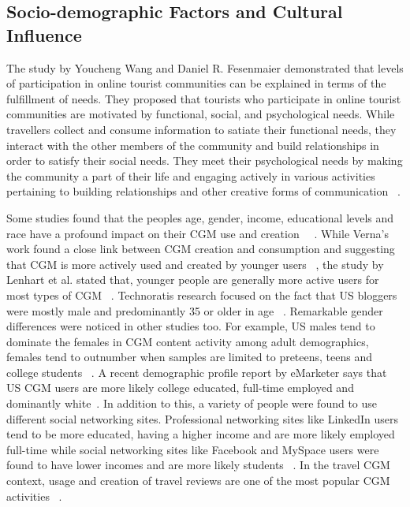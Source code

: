 \subsection{Socio-demographic Factors and Cultural Influence}

 

The study by Youcheng Wang and Daniel R. Fesenmaier demonstrated that levels of participation in online tourist communities can be explained in terms of the fulfillment of needs. They proposed that tourists who participate in online tourist communities are motivated by functional, social, and psychological needs. While travellers collect and consume information to satiate their functional needs, they interact with the other members of the community and build relationships in order to satisfy their social needs. They meet their psychological needs by making the community a part of their life and engaging actively in various activities pertaining to building relationships and other creative forms of communication ~\cite{wang2002defining}.

Some studies found that the people\textquotesingle s age, gender, income, educational levels and race have a profound impact on their CGM use and creation ~\cite{lenhart2008teens}~\cite{verna2009user}. While Verna's work  found a close link between CGM creation and consumption and suggesting that CGM is more actively used and created by younger users ~\cite{verna2009user}, the study by Lenhart et al. stated that, younger people are generally more active users for most types of CGM ~\cite{lenhart2008teens}.  Technorati\textquotesingle s research focused on the fact that US bloggers were mostly male and predominantly 35 or older in age ~\cite{technorati2008}. Remarkable gender differences were noticed in other studies too. For example, US males tend to dominate the females in CGM content activity among adult demographics, females tend to outnumber when samples are limited to preteens, teens and college students ~\cite{verna2009user}. A recent demographic profile report by eMarketer says that US CGM users are more likely college educated, full-time employed and dominantly white~\cite{eMarketer2009}. In addition to this, a variety of people were found to use different social networking sites. Professional networking sites like LinkedIn users tend to be more educated, having a higher income and are more likely employed full-time while social networking sites like Facebook and MySpace users were found to have lower incomes and are more likely students ~\cite{eMarketer2009}. In the travel CGM context, usage and creation of travel reviews are one of the most popular CGM activities ~\cite{gretzel2007online}.
 

